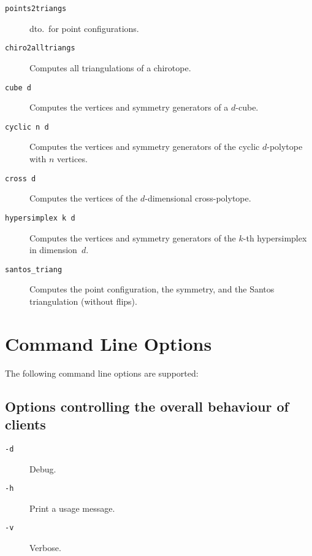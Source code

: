 \documentclass[12pt,a4paper]{article}
\begin{document}
\begin{description}
\item[\texttt{points2triangs}] dto.\ for point configurations.
\item[\texttt{chiro2alltriangs}] Computes all triangulations of a chirotope.
\item[\texttt{cube d}] Computes the vertices and symmetry generators of a
  $d$-cube.
\item[\texttt{cyclic n d}] Computes the vertices and symmetry generators of
  the cyclic $d$-polytope with $n$ vertices.
\item[\texttt{cross d}] Computes the vertices of the $d$-dimensional cross-polytope.
\item[\texttt{hypersimplex k d}] Computes the vertices and symmetry generators of 
  the $k$-th hypersimplex in dimension~$d$.
\item[\texttt{santos\_triang}] Computes the point configuration, the symmetry,
  and the Santos triangulation (without flips).
\end{description}



\section{Command Line Options}
\label{sec:options}

The following command line options are supported:

\subsection*{Options controlling the overall behaviour of clients}
\begin{description}
\item[\texttt{-d}] Debug.
\item[\texttt{-h}] Print a usage message.
\item[\texttt{-v}] Verbose.
\end{description}
\end{document}
